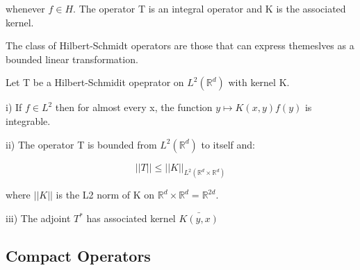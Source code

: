 \documentclass[class=article, crop=false]{standalone}
\begin{document}
			whenever $f \in H$. The operator T is an integral operator and K is the associated kernel.

			The class of Hilbert-Schmidt operators are those that can express themeslves as a bounded linear transformation.

			\begin{proposition}
				Let T be a Hilbert-Schmidit opeprator on $L^2(\mathbb{R}^d)$ with kernel K.

				i) If $f \in L^2$ then for almost every x, the function $y \mapsto K(x,y)f(y)$ is integrable.

				ii) The operator T is bounded from $L^2(\mathbb{R}^d)$ to itself and:

					$$||T|| \le ||K||_{L^2(\mathbb{R}^d \times \mathbb{R}^d)}$$

				where $||K||$ is the L2 norm of K on $\mathbb{R}^d \times \mathbb{R}^d = \mathbb{R}^{2d}$.

				iii) The adjoint $T^*$ has associated kernel $\bar{K(y,x)}$
			\end{proposition}

	\subsection{Compact Operators}
\end{document}
